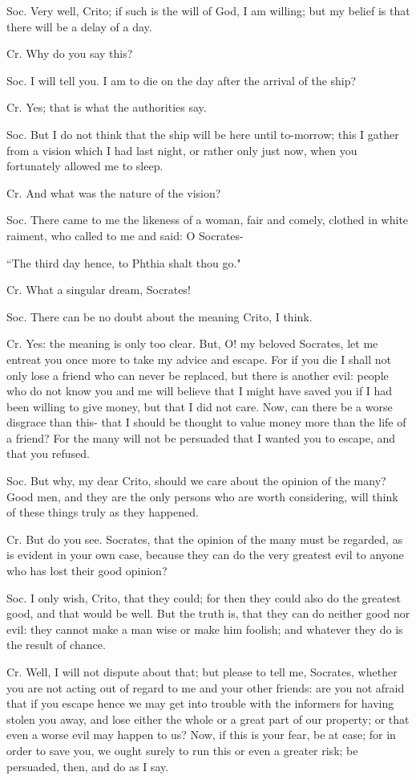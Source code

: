 Soc. Very well, Crito; if such is the will of God, I am willing; but
my belief is that there will be a delay of a day. 

Cr. Why do you say this? 

Soc. I will tell you. I am to die on the day after the arrival of
the ship? 

Cr. Yes; that is what the authorities say. 

Soc. But I do not think that the ship will be here until to-morrow;
this I gather from a vision which I had last night, or rather only
just now, when you fortunately allowed me to sleep. 

Cr. And what was the nature of the vision? 

Soc. There came to me the likeness of a woman, fair and comely, clothed
in white raiment, who called to me and said: O Socrates-

``The third day hence, to Phthia shalt thou go." 

Cr. What a singular dream, Socrates! 

Soc. There can be no doubt about the meaning Crito, I think.

Cr. Yes: the meaning is only too clear. But, O! my beloved Socrates,
let me entreat you once more to take my advice and escape. For if
you die I shall not only lose a friend who can never be replaced,
but there is another evil: people who do not know you and me will
believe that I might have saved you if I had been willing to give
money, but that I did not care. Now, can there be a worse disgrace
than this- that I should be thought to value money more than the life
of a friend? For the many will not be persuaded that I wanted you
to escape, and that you refused. 

Soc. But why, my dear Crito, should we care about the opinion of the
many? Good men, and they are the only persons who are worth considering,
will think of these things truly as they happened. 

Cr. But do you see. Socrates, that the opinion of the many must be
regarded, as is evident in your own case, because they can do the
very greatest evil to anyone who has lost their good opinion?

Soc. I only wish, Crito, that they could; for then they could also
do the greatest good, and that would be well. But the truth is, that
they can do neither good nor evil: they cannot make a man wise or
make him foolish; and whatever they do is the result of chance.

Cr. Well, I will not dispute about that; but please to tell me, Socrates,
whether you are not acting out of regard to me and your other friends:
are you not afraid that if you escape hence we may get into trouble
with the informers for having stolen you away, and lose either the
whole or a great part of our property; or that even a worse evil may
happen to us? Now, if this is your fear, be at ease; for in order
to save you, we ought surely to run this or even a greater risk; be
persuaded, then, and do as I say. 

